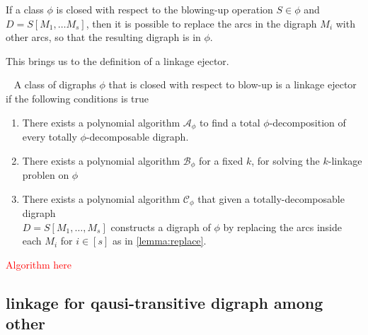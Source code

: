 \begin{lemma}
    If a class $\phi$ is closed with respect to the blowing-up operation $S\in \phi$ and $D=S[M_1,\dots M_s]$, then it is possible to replace the arcs in the digraph $M_i$ with other arcs, so that the resulting digraph is in $\phi$. 
    \label{lemma:replace} 
\end{lemma}

This brings us to the definition of a linkage ejector.
\begin{definition}~\cite{bangJGT85}
    A class of digraphs $\phi$ that is closed with respect to blow-up is a linkage ejector if the following conditions is true
    \begin{enumerate}
        \item There exists a polynomial algorithm $\mathcal{A}_{\phi}$ to find a total $\phi$-decomposition of every totally $\phi$-decomposable digraph.
        \item There exists a polynomial algorithm $\mathcal{B}_{\phi}$ for a fixed $k$, for solving the $k$-linkage problen on $\phi$
        \item There exists a polynomial algorithm $\mathcal{C}_{\phi}$ that given a totally-decomposable digraph\\ $D=S[M_1,\dots , M_s]$ constructs a digraph of $\phi$ by replacing the arcs inside each $M_i$ for $i\in [s]$ as in \autoref{lemma:replace}. 
    \end{enumerate}
\end{definition}

\textcolor{red}{Algorithm here}

\subsection{linkage for qausi-transitive digraph among other}
